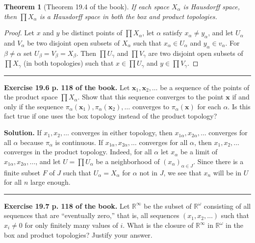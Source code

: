\documentclass[12pt,letterpaper]{article}
\newtheorem{thm}{Theorem}%
\newcommand{\noi}{\noindent}%
\begin{document}
\begin{thm}[Theorem 19.4 of the book]
If each space $X_{\alpha}$ is Hausdorff space, then $\prod X_\alpha$ is a Hausdorff space in both the box and product topologies.
\end{thm} 

\begin{proof} 
Let $x$ and $y$ be distinct points of $\prod X_\alpha$, let $\alpha$ satisfy $x_\alpha\ne y_\alpha$, and let $U_\alpha$ and $V_\alpha$ be two disjoint open subsets of $X_\alpha$ such that $x_\alpha\in U_\alpha$ and $y_\alpha\in v_\alpha$. For $\beta\ne\alpha$ set $U_\beta=V_\beta=X_\beta$. Then $\prod U_\gamma$ and $\prod V_\gamma$ are two disjoint open subsets of $\prod X_\gamma$ (in both topologies) such that $x\in\prod U_\gamma$ and $y\in\prod V_\gamma$. 
\end{proof} 

\smallskip\hrule\medskip 

\noi\textbf{Exercise 19.6 p. 118 of the book.} Let $\mathbf{x}_1, \mathbf{x}_2, \ldots$ be a sequence of the points of the product space $\prod X_{\alpha}$. Show that this sequence converges to the point $\mathbf{x}$ if and only if the sequence $\pi_{\alpha}\left(\mathbf{x}_1\right), \pi_{\alpha}\left(\mathbf{x}_2\right), \ldots$ converges to $\pi_{\alpha}(\mathbf{x})$ for each $\alpha$. Is this fact true if one uses the box topology instead of the product topology? 

\noi\textbf{Solution.} If $x_1,x_2,\ldots$ converges in either topology, then $x_{1\alpha},x_{2\alpha},\ldots$ converges for all $\alpha$ because $\pi_\alpha$ is continuous. If $x_{1\alpha},x_{2\alpha},\ldots$ converges for all $\alpha$, then $x_1,x_2,\ldots$ converges in the product topology. Indeed, for all $\alpha$ let $x_\alpha$ be a limit of $x_{1\alpha},x_{2\alpha},\ldots$, and let $U=\prod U_\alpha$ be a neighborhood of $(x_\alpha)_{\alpha\in J}$. Since there is a finite subset $F$ of $J$ such that $U_\alpha=X_\alpha$ for $\alpha$ not in $J$, we see that $x_n$ will be in $U$ for all $n$ large enough. 

\bigskip\hrule\medskip 

\noi\textbf{Exercise 19.7 p. 118 of the book.} Let $\mathbb{R}^{\infty}$ be the subset of $\mathbb{R}^{\omega}$ consisting of all sequences that are ``eventually zero,'' that is, all sequences $\left(x_1, x_2, \ldots\right)$ such that $x_{i} \neq 0$ for only finitely many values of $i$. What is the closure of $\mathbb{R}^{\infty}$ in $\mathbb{R}^{\omega}$ in the box and product topologies? Justify your answer. 
\end{document}
